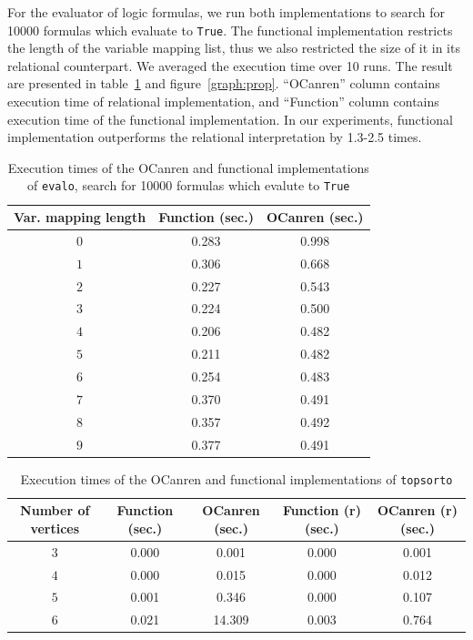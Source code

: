 For the evaluator of logic formulas, we run both implementations to search for 10000 formulas which evaluate to \lstinline{True}.
The functional implementation restricts the length of the variable mapping list, thus we also restricted the size of it in its relational counterpart.
We averaged the execution time over 10 runs.
The result are presented in table~\ref{tbl:prop} and figure~\ref{graph:prop}.
``OCanren'' column contains execution time of relational implementation, and ``Function'' column contains execution time of the functional implementation.
In our experiments, functional implementation outperforms the relational interpretation by 1.3-2.5 times.


\begin{table}
  \caption{Execution times of the OCanren and functional implementations of \lstinline{evalo}, search for 10000 formulas which evalute to \lstinline{True}}
  \label{tbl:prop}
  \begin{tabular}{ccc}
    \toprule
    Var. mapping length&Function (sec.)&OCanren (sec.)\\
    \midrule
    $0$ & 0.283 & 0.998 \\
    $1$ & 0.306 & 0.668 \\
    $2$ & 0.227 & 0.543 \\
    $3$ & 0.224 & 0.500 \\
    $4$ & 0.206 & 0.482 \\
    $5$ & 0.211 & 0.482 \\
    $6$ & 0.254 & 0.483 \\
    $7$ & 0.370 & 0.491 \\
    $8$ & 0.357 & 0.492 \\
    $9$ & 0.377 & 0.491 \\
  \bottomrule
\end{tabular}
\end{table}

\begin{table}
  \caption{Execution times of the OCanren and functional implementations of \lstinline{topsorto}}
  \label{tbl:sort}
  \begin{tabular}{ccccc}
    \toprule
    Number of vertices&Function (sec.)&OCanren (sec.)&Function (r) (sec.)&OCanren (r) (sec.)\\
    \midrule
    $3$ & 0.000 & 0.001  & 0.000 & 0.001 \\
    $4$ & 0.000 & 0.015  & 0.000 & 0.012 \\
    $5$ & 0.001 & 0.346  & 0.000 & 0.107 \\
    $6$ & 0.021 & 14.309 & 0.003 & 0.764 \\
  \bottomrule
\end{tabular}
\end{table}

